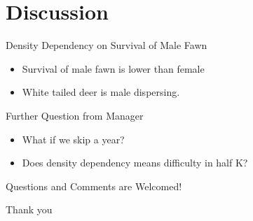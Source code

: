 \documentclass{beamer}
\begin{document}
\section{Discussion}
\begin{frame}{Density Dependency on Survival of Male Fawn}
	\begin{itemize}
		\item Survival of male fawn is lower than female
		\item White tailed deer is male dispersing.
	\end{itemize}
\end{frame}

\begin{frame}{Further Question from Manager}
	\begin{itemize}
		\item What if we skip a year?
		\item Does density dependency means difficulty in half K?
	\end{itemize}
	
\end{frame}

\begin{frame}
	\huge{Questions and Comments are Welcomed!}
\end{frame}

\begin{frame}
	\Huge{Thank you}
\end{frame}
\end{document}
